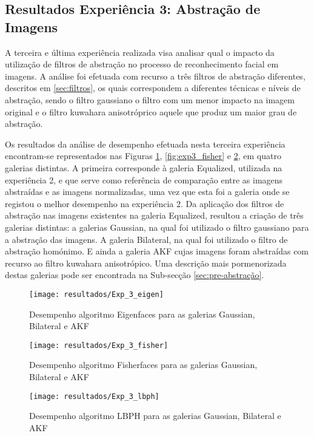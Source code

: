 \subsection{Resultados Experiência 3: Abstração de Imagens}
A terceira e última experiência realizada visa analisar qual o impacto da utilização de filtros de abstração no processo de reconhecimento facial em imagens. A análise foi efetuada com recurso a três filtros de abstração diferentes, descritos em \ref{sec:filtros}, os quais correspondem a diferentes técnicas e níveis de abstração, sendo o filtro gaussiano o filtro com um menor impacto na imagem original e o filtro kuwahara anisotróprico aquele que produz um maior grau de abstração. 

Os resultados da análise de desempenho efetuada nesta terceira experiência encontram-se representados nas Figuras \ref{fig:exp3_eigen}, \ref{fig:exp3_fisher} e \ref{fig:exp3_lbph}, em quatro galerias distintas. A primeira corresponde à galeria Equalized, utilizada na experiência 2, e que serve como referência de comparação entre as imagens abstraídas e as imagens normalizadas, uma vez que esta foi a galeria onde se registou o melhor desempenho na experiência 2. Da aplicação dos filtros de abstração nas imagens existentes na galeria Equalized, resultou a criação de três galerias distintas: a galerias Gaussian, na qual foi utilizado o filtro gaussiano para a abstração das imagens. A galeria Bilateral, na qual foi utilizado o filtro de abstração homónimo. E ainda a galeria AKF cujas imagens foram abstraídas com recurso ao filtro kuwahara anisotrópico. Uma descrição mais pormenorizada destas galerias pode ser encontrada na Sub-secção \ref{sec:pre-abstração}.

        \begin{figure}[ht]
                \centering
                \texttt{[image: resultados/Exp\_3\_eigen]}
                \caption{Desempenho algoritmo Eigenfaces para as galerias Gaussian, Bilateral e AKF}
                \label{fig:exp3_eigen}
        \end{figure}%

        \begin{figure}[p]
                \centering
                \texttt{[image: resultados/Exp\_3\_fisher]}
                \caption{Desempenho algoritmo Fisherfaces para as galerias Gaussian, Bilateral e AKF}
                \label{fig:exp3_fisher}
                \centering
                \texttt{[image: resultados/Exp\_3\_lbph]}
                \caption{Desempenho algoritmo LBPH para as galerias Gaussian, Bilateral e AKF}
                \label{fig:exp3_lbph}                
        \end{figure}%
        
